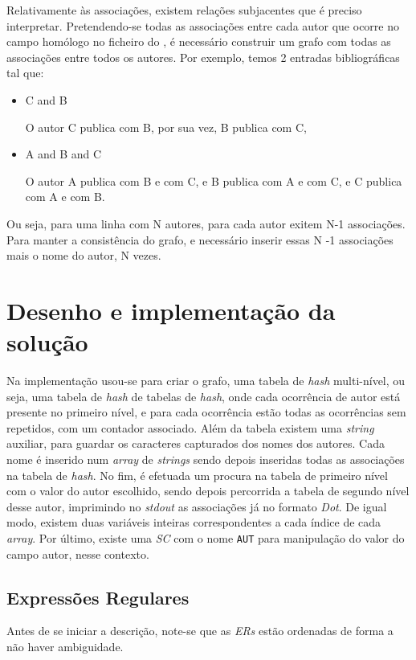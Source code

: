 Relativamente às associações, existem relações subjacentes que
é preciso interpretar. Pretendendo-se todas as associações entre cada autor que
ocorre no campo homólogo no ficheiro do , é necessário
construir um grafo com todas as associações entre todos os autores.
Por exemplo, temos 2 entradas bibliográficas tal que: 

\begin{itemize}
	\item C and B 


O autor C publica com B, por sua vez, B publica com C,
	\item A and B and C


O autor A publica com B e com C, e B publica com A e com C,
e C publica com A e com B.
\end{itemize}

Ou seja, para uma linha com N autores, para cada autor
exitem N-1 associações. Para manter a consistência do grafo, e necessário inserir
essas N -1 associações mais o nome do autor, N vezes.



\section{Desenho e implementação da solução}
\label{sec:des:c}
Na implementação usou-se para criar o grafo, uma tabela de \emph{hash}
multi-nível, ou seja, uma tabela de \emph{hash} de tabelas de \emph{hash}, onde
cada ocorrência de autor está presente no primeiro nível, e para cada ocorrência
estão todas as ocorrências sem repetidos, com um contador associado. Além da
tabela existem uma \emph{string} auxiliar, para guardar os caracteres capturados
dos nomes dos autores. Cada nome é inserido num \emph{array} de \emph{strings}
sendo depois inseridas todas as associações na tabela de \emph{hash}. No fim,
é efetuada um procura na tabela de primeiro nível com o valor do autor
escolhido, sendo depois percorrida a tabela de segundo nível desse autor,
imprimindo no \emph{stdout} as associações já no formato \emph{Dot}. De igual
modo, existem duas variáveis inteiras correspondentes a cada índice de cada
\emph{array}. Por último, existe uma \emph{SC} com o nome \texttt{AUT} para
manipulação do valor do campo autor, nesse contexto.  



\subsection{Expressões Regulares}
Antes de se iniciar a descrição, note-se que as \emph{ERs} estão ordenadas de
forma a não haver ambiguidade.


